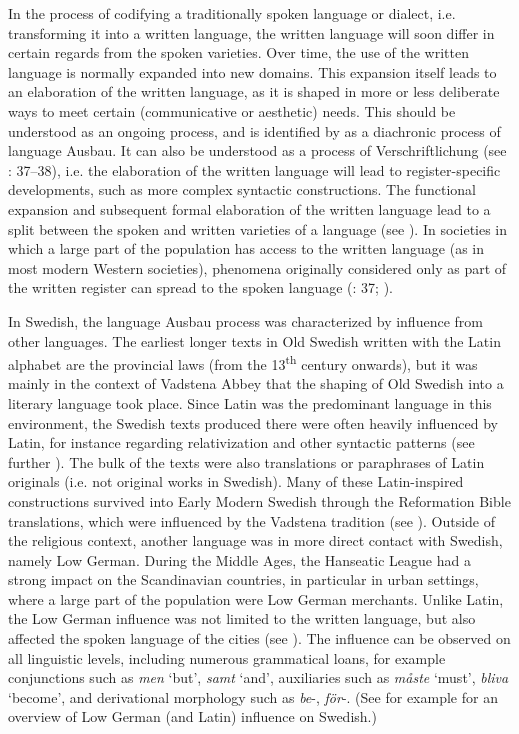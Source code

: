 \documentclass[output=paper]{langscibook}
\begin{document}
In the process of codifying a traditionally spoken language or dialect, i.e. transforming it into a written language, the written language will soon differ in certain regards from the spoken varieties. Over time, the use of the written language is normally expanded into new domains. This expansion itself leads to an elaboration of the written language, as it is shaped in more or less deliberate ways to meet certain (communicative or aesthetic) needs. This should be understood as an ongoing process, and is identified by \citet{Kloss1967} as a diachronic process of language Ausbau. It can also be understood as a process of Verschriftlichung (see \citealt{Fischer2007}: 37–38), i.e. the elaboration of the written language will lead to register-specific developments, such as more complex syntactic constructions. The functional expansion and subsequent formal elaboration of the written language lead to a split between the spoken and written varieties of a language (see \citealt{Hoder2009}). In societies in which a large part of the population has access to the written language (as in most modern Western societies), phenomena originally considered only as part of the written register can spread to the spoken language (\citealt{Fischer2007}: 37; \citealt{Weis2004}). 



In Swedish, the language Ausbau process was characterized by influence from other languages. The earliest longer texts in Old Swedish written with the Latin alphabet are the provincial laws (from the 13\textsuperscript{th} century onwards), but it was mainly in the context of Vadstena Abbey that the shaping of Old Swedish into a literary language took place. Since Latin was the predominant language in this environment, the Swedish texts produced there were often heavily influenced by Latin, for instance regarding relativization and other syntactic patterns (see further \citealt{Hoder2009, Hoder2010, Wollin1981, Wollin1983}). The bulk of the texts were also translations or paraphrases of Latin originals (i.e. not original works in Swedish). Many of these Latin-inspired constructions survived into Early Modern Swedish through the Reformation Bible translations, which were influenced by the Vadstena tradition (see \citealt{Stahle1970, Teleman2002, Teleman2003Swedish}). Outside of the religious context, another language was in more direct contact with Swedish, namely Low German. During the Middle Ages, the Hanseatic League had a strong impact on the Scandinavian countries, in particular in urban settings, where a large part of the population were Low German merchants. Unlike Latin, the Low German influence was not limited to the written language, but also affected the spoken language of the cities (see \citealt{Braunmuller1997,Braunmuller2005,}). The influence can be observed on all linguistic levels, including numerous grammatical loans, for example conjunctions such as \textit{men} ‘but’, \textit{samt} ‘and’, auxiliaries such as \textit{måste} ‘must’, \textit{bliva} ‘become’, and derivational morphology such as \textit{be}{}-, \textit{för}{}-. (See for example \citealt{Braunmuller2005} for an overview of Low German (and Latin) influence on Swedish.)
\end{document}
